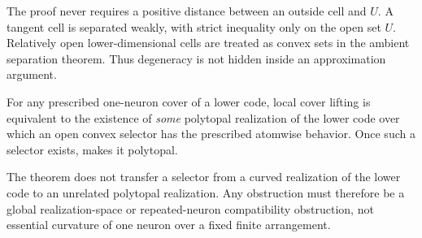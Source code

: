 \begin{remark}
The proof never requires a positive distance between an outside cell and $U$.  A tangent cell is separated weakly, with strict inequality only on the open set $U$.  Relatively open lower-dimensional cells are treated as convex sets in the ambient separation theorem.  Thus degeneracy is not hidden inside an approximation argument.
\end{remark}

\begin{corollary}
For any prescribed one-neuron cover of a lower code, local cover lifting is equivalent to the existence of \emph{some} polytopal realization of the lower code over which an open convex selector has the prescribed atomwise behavior.  Once such a selector exists,  makes it polytopal.
\end{corollary}

\begin{remark}
The theorem does not transfer a selector from a curved realization of the lower code to an unrelated polytopal realization.  Any obstruction must therefore be a global realization-space or repeated-neuron compatibility obstruction, not essential curvature of one neuron over a fixed finite arrangement.
\end{remark}
